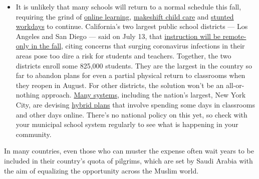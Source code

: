 \begin{itemize}
  \begin{itemize}
  \tightlist
  \item
    It is unlikely that many schools will return to a normal schedule
    this fall, requiring the grind of
    \href{https://www.nytimes.com/2020/06/05/us/coronavirus-education-lost-learning.html?action=click\&pgtype=Article\&state=default\&region=MAIN_CONTENT_3\&context=storylines_faq}{online
    learning},
    \href{https://www.nytimes.com/2020/05/29/us/coronavirus-child-care-centers.html?action=click\&pgtype=Article\&state=default\&region=MAIN_CONTENT_3\&context=storylines_faq}{makeshift
    child care} and
    \href{https://www.nytimes.com/2020/06/03/business/economy/coronavirus-working-women.html?action=click\&pgtype=Article\&state=default\&region=MAIN_CONTENT_3\&context=storylines_faq}{stunted
    workdays} to continue. California's two largest public school
    districts --- Los Angeles and San Diego --- said on July 13, that
    \href{https://www.nytimes.com/2020/07/13/us/lausd-san-diego-school-reopening.html?action=click\&pgtype=Article\&state=default\&region=MAIN_CONTENT_3\&context=storylines_faq}{instruction
    will be remote-only in the fall}, citing concerns that surging
    coronavirus infections in their areas pose too dire a risk for
    students and teachers. Together, the two districts enroll some
    825,000 students. They are the largest in the country so far to
    abandon plans for even a partial physical return to classrooms when
    they reopen in August. For other districts, the solution won't be an
    all-or-nothing approach.
    \href{https://bioethics.jhu.edu/research-and-outreach/projects/eschool-initiative/school-policy-tracker/}{Many
    systems}, including the nation's largest, New York City, are
    devising
    \href{https://www.nytimes.com/2020/06/26/us/coronavirus-schools-reopen-fall.html?action=click\&pgtype=Article\&state=default\&region=MAIN_CONTENT_3\&context=storylines_faq}{hybrid
    plans} that involve spending some days in classrooms and other days
    online. There's no national policy on this yet, so check with your
    municipal school system regularly to see what is happening in your
    community.
  \end{itemize}
\end{itemize}

In many countries, even those who can muster the expense often wait
years to be included in their country's quota of pilgrims, which are set
by Saudi Arabia with the aim of equalizing the opportunity across the
Muslim world.

